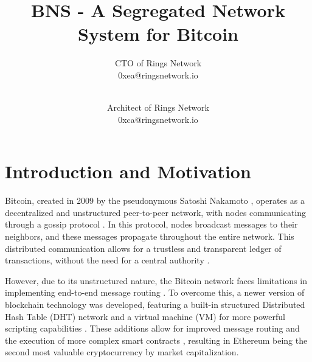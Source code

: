 \documentclass[twocolumn]{article}
\author{
  CTO of Rings Network \\ 0xea@ringsnetwork.io \\ \\
  \and
  Architect of Rings Network \\ 0xca@ringsnetwork.io
}
\title{BNS - A Segregated Network System for Bitcoin}
\begin{document}

\section{Introduction and Motivation}

Bitcoin, created in 2009 by the pseudonymous Satoshi Nakamoto \cite{nakamoto2008bitcoin}, operates as a decentralized and unstructured peer-to-peer network, with nodes communicating through a gossip protocol \cite{bano2017consensus}. In this protocol, nodes broadcast messages to their neighbors, and these messages propagate throughout the entire network. This distributed communication allows for a trustless and transparent ledger of transactions, without the need for a central authority \cite{antonopoulos2014mastering}.

However, due to its unstructured nature, the Bitcoin network faces limitations in implementing end-to-end message routing \cite{bano2017consensus}. To overcome this, a newer version of blockchain technology was developed, featuring a built-in structured Distributed Hash Table (DHT) network and a virtual machine (VM) for more powerful scripting capabilities \cite{wood2014ethereum}. These additions allow for improved message routing and the execution of more complex smart contracts \cite{buterin2014ethereum}, resulting in Ethereum being the second most valuable cryptocurrency by market capitalization.
\end{document}
